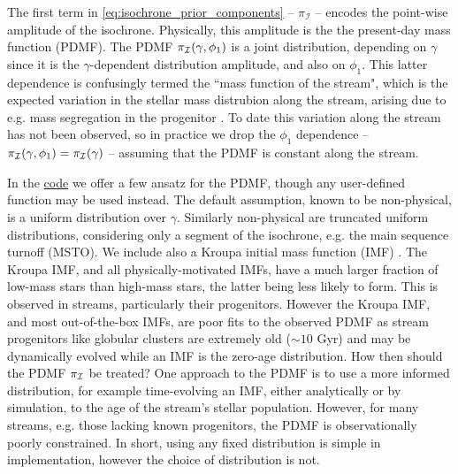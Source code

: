 \documentclass[twocolumn]{aastex631}
\newcommand{\mcal}[1]{\mathcal{#1}}
\newcommand{\prior}{\mcal{\pi}}
\newcommand{\TODO}[1]{{\textcolor{red}{#1}}}
\begin{document}
            The first term in \autoref{eq:isochrone_prior_components} --
            $\prior_{\mcal{I}}$ -- encodes the point-wise amplitude of the
            isochrone.  Physically, this amplitude is the the present-day mass
            function (PDMF). The PDMF $\prior_{\cal{I}}(\gamma, \phi_1)$ is a
            joint distribution, depending on $\gamma$ since it is the
            $\gamma$-dependent distribution amplitude, and also on $\phi_1$.
            This latter dependence is confusingly termed the ``mass function of
            the stream", which is the expected variation in the stellar mass
            distrubion along the stream, arising due to e.g. mass segregation in
            the progenitor \citep{WebbBovy2022}. To date this variation along
            the stream has not been observed, so in practice we drop the
            $\phi_1$ dependence -- $\prior_{\cal{I}}(\gamma, \phi_1) =
            \prior_{\cal{I}}(\gamma)$ -- assuming that the PDMF is constant
            along the stream.

            In the \href{https://github.com/GalOrrery/stream_ml-pytorch}{code}
            we offer a few ansatz for the PDMF, though any user-defined function
            may be used instead. The default assumption, known to be
            non-physical, is a uniform distribution over $\gamma$.  Similarly
            non-physical are truncated uniform distributions, considering only a
            segment of the isochrone, e.g. the main sequence turnoff (MSTO). We
            include also a Kroupa initial mass function (IMF)
            \citep{Kroupa2001}. The Kroupa IMF, and all physically-motivated
            IMFs, have a much larger fraction of low-mass stars than high-mass
            stars, the latter being less likely to form.  This is observed in
            streams, particularly their progenitors. However the Kroupa IMF, and
            most out-of-the-box IMFs, are poor fits to the observed PDMF as
            stream progenitors like globular clusters are extremely old
            ($\sim10$ Gyr) and may be dynamically evolved
            \citep{GrillmairSmith2001} while an IMF is the zero-age
            distribution.  How then should the PDMF $\prior_{\cal{I}}$ be
            treated?  One approach to the PDMF is to use a more informed
            distribution, for example time-evolving an IMF, either analytically
            or by simulation, to the age of the stream's stellar population. %
            However, for many streams, e.g. those lacking known progenitors,
            the PDMF is observationally poorly constrained.  In short, using any
            fixed distribution is simple in implementation, however the choice
            of distribution is not.
\end{document}
